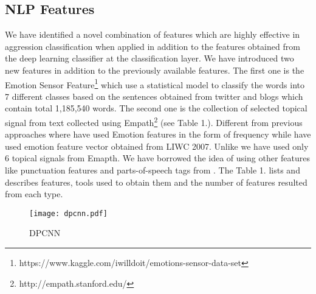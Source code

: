 \documentclass[sigconf]{acmart}
\begin{document}
\raggedbottom
\subsection{NLP Features}\label{nlp}
We have identified a novel combination of features which are highly effective in aggression classification when applied in addition to the features obtained from the deep learning classifier at the classification layer. We have introduced two new features in addition to the previously available features. The first one is the Emotion Sensor Feature\footnote{https://www.kaggle.com/iwilldoit/emotions-sensor-data-set}  which use a statistical model to classify the words into 7 different classes based on the sentences obtained from twitter and blogs which contain total 1,185,540 words. The second one is the collection of selected topical signal from text collected using Empath\footnote{http://empath.stanford.edu/} (see Table 1.).\newline
Different from previous approaches\cite{samghabadi2018ritual, ramiandrisoa2018irit} where \cite{ramiandrisoa2018irit} have used Emotion features in the form of frequency while \cite{samghabadi2018ritual} have used emotion feature vector obtained from LIWC 2007\cite{pennebaker2007linguistic}. Unlike\cite{ramiandrisoa2018irit} we have used only 6 topical signals from Emapth\cite{fast2016empath}. We have borrowed the idea of using other features like punctuation features and parts-of-speech tags from \cite{ramiandrisoa2018irit}. The Table 1. lists and describes features, tools used to obtain them and the number of features resulted from each type.
\raggedbottom
\begin{figure}[h]
    \centering
    \texttt{[image: dpcnn.pdf]}
    \caption{DPCNN}
    \label{fig:dpcnn}
\end{figure}
\end{document}
